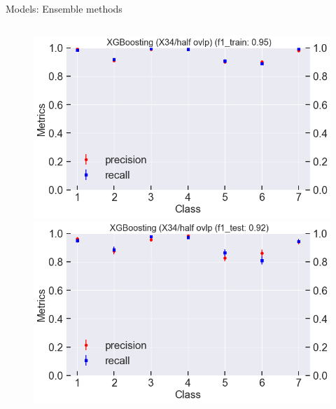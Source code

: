 \documentclass{if-beamer}
\begin{document}
\begin{frame}{Models:  Ensemble methods}
\begin{columns}
\begin{column}{0.5\textwidth}
             \begin{figure}
            \includegraphics[scale=0.23]{./figs/xgb_X34_train.png}
            \includegraphics[scale=0.23]{./figs/xgb_X34_test.png}
            \end{figure}  
        
 \end{column}

 \end{columns}
  \end{frame}
  
\end{document}
